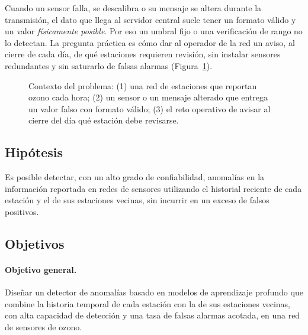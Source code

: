 \documentclass[11pt, letterpaper]{article}
\newcommand{\figurapresentacion}[1]{%
  \adjustbox{max width=\linewidth}{}}
\begin{document}
Cuando un sensor falla, se descalibra o su mensaje se altera durante la transmisión, el
dato que llega al servidor central suele tener un formato válido y un valor
\emph{físicamente posible}. Por eso un umbral fijo o una verificación de rango no lo
detectan. La pregunta práctica es cómo dar al operador de la red un aviso, al cierre de
cada día, de qué estaciones requieren revisión, sin instalar sensores redundantes y sin
saturarlo de falsas alarmas (Figura~\ref{fig:contexto}).

\begin{figure}[H]
  \centering
  \figurapresentacion{contexto_problema}
  \caption{Contexto del problema: (1) una red de estaciones que reportan ozono cada hora;
    (2) un sensor o un mensaje alterado que entrega un valor falso con formato válido;
    (3) el reto operativo de avisar al cierre del día qué estación debe revisarse.}
  \label{fig:contexto}
\end{figure}

\subsection{Hipótesis}

Es posible detectar, con un alto grado de confiabilidad, anomalías en la información
reportada en redes de sensores utilizando el historial reciente de cada estación y el de
sus estaciones vecinas, sin incurrir en un exceso de falsos positivos.

\subsection{Objetivos}

\paragraph{Objetivo general.} Diseñar un detector de anomalías basado en modelos de
aprendizaje profundo que combine la historia temporal de cada estación con la de sus
estaciones vecinas, con alta capacidad de detección y una tasa de falsas alarmas acotada,
en una red de sensores de ozono.
\end{document}
